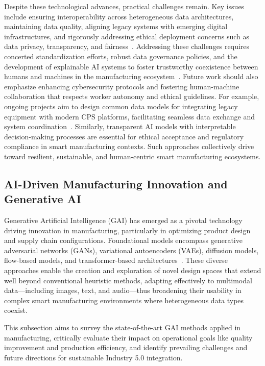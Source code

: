 \documentclass[sigconf]{acmart}
\begin{document}
Despite these technological advances, practical challenges remain. Key issues include ensuring interoperability across heterogeneous data architectures, maintaining data quality, aligning legacy systems with emerging digital infrastructures, and rigorously addressing ethical deployment concerns such as data privacy, transparency, and fairness~\cite{ref42,ref6}. Addressing these challenges requires concerted standardization efforts, robust data governance policies, and the development of explainable AI systems to foster trustworthy coexistence between humans and machines in the manufacturing ecosystem~\cite{ref38,ref42}. Future work should also emphasize enhancing cybersecurity protocols and fostering human-machine collaboration that respects worker autonomy and ethical guidelines. For example, ongoing projects aim to design common data models for integrating legacy equipment with modern CPS platforms, facilitating seamless data exchange and system coordination~\cite{ref38}. Similarly, transparent AI models with interpretable decision-making processes are essential for ethical acceptance and regulatory compliance in smart manufacturing contexts. Such approaches collectively drive toward resilient, sustainable, and human-centric smart manufacturing ecosystems.

\subsection{AI-Driven Manufacturing Innovation and Generative AI}

Generative Artificial Intelligence (GAI) has emerged as a pivotal technology driving innovation in manufacturing, particularly in optimizing product design and supply chain configurations. Foundational models encompass generative adversarial networks (GANs), variational autoencoders (VAEs), diffusion models, flow-based models, and transformer-based architectures~\cite{ref1,ref8}. These diverse approaches enable the creation and exploration of novel design spaces that extend well beyond conventional heuristic methods, adapting effectively to multimodal data—including images, text, and audio—thus broadening their usability in complex smart manufacturing environments where heterogeneous data types coexist.

This subsection aims to survey the state-of-the-art GAI methods applied in manufacturing, critically evaluate their impact on operational goals like quality improvement and production efficiency, and identify prevailing challenges and future directions for sustainable Industry 5.0 integration.
\end{document}
